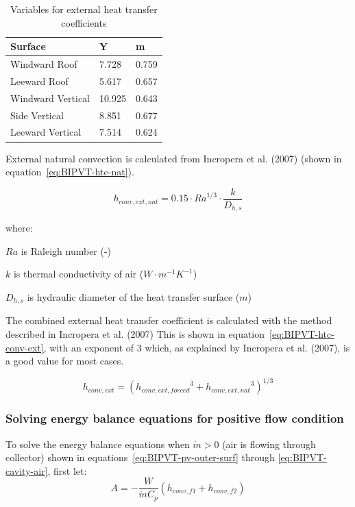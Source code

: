 \begin{table}[htbp]
	\centering
		\begin{tabular}{lll}
\hline
Surface           & Y      & m     \\ \hline
Windward Roof     & 7.728  & 0.759 \\
Leeward Roof      & 5.617  & 0.657 \\
Windward Vertical & 10.925 & 0.643 \\
Side Vertical     & 8.851  & 0.677 \\
Leeward Vertical  & 7.514  & 0.624 \\ \hline
			
		\end{tabular}
	\caption{Variables for external heat transfer coefficients}
	\label{tab:BIPVT-table-htc-ext}
\end{table}


External natural convection is calculated from Incropera et al. (2007) (shown in equation~\ref{eq:BIPVT-htc-nat}).

\begin{equation}
h_{conv,ext,nat}=0.15\cdot{Ra}^{1/3}\cdot\frac{k}{D_{h,s}}
\label{eq:BIPVT-htc-nat}
\end{equation}

where:

\(Ra\) is Raleigh number (-)

\(k\) is thermal conductivity of air (\(W\cdot m^{-1}K^{-1}\))

\(D_{h,s}\) is hydraulic diameter of the heat transfer surface (\(m\))

The combined external heat transfer coefficient is calculated with the method described in Incropera et al. (2007) This is shown in equation~\ref{eq:BIPVT-htc-conv-ext}, with an exponent of 3 which, as explained by Incropera et al. (2007), is a good value for most cases.

\begin{equation}
h_{conv,ext}=\left({h_{conv,ext,forced}}^3+{h_{conv,ext,nat}}^3\right)^{1/3}
\label{eq:BIPVT-htc-conv-ext}
\end{equation}

\subsubsection{Solving energy balance equations for positive flow condition}\label{BIPVT-solving}

To solve the energy balance equations when \(\dot{m}>0\) (air is flowing through collector) shown in equations~\ref{eq:BIPVT-pv-outer-surf} through \ref{eq:BIPVT-cavity-air}, first let:
\begin{equation}
A=-\frac{W}{\dot{m}C_p}\left(h_{conv,f1}+h_{conv,f2}\right)
\label{eq:BIPVT-A}
\end{equation}

